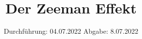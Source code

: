 

\subject{V27}
\title{Der Zeeman Effekt}
\date{%
  Durchführung: 04.07.2022
  \hspace{3em}
  Abgabe: 8.07.2022
}



\maketitle
\thispagestyle{empty}
\tableofcontents
\newpage





\nocite{*}
\printbibliography{}


